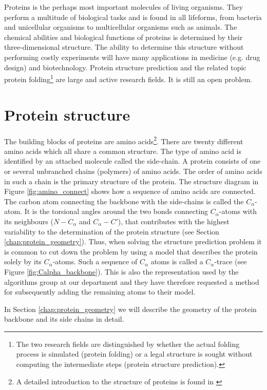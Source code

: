 Proteins is the perhaps most important molecules of living
organisms. They perform a multitude of biological tasks and is found
in all lifeforms, from bacteria and unicellular organisms to
multicellular organisms such as animals. The chemical abilities and
biological functions of proteins is determined by their
three-dimensional structure. The ability to determine this structure
without performing costly experiments will have many applications in
medicine (e.g. drug design) and biotechnology. Protein structure
prediction and the related topic protein folding\footnote{The two
  research fields are distinguished by whether the actual folding
  process is simulated (protein folding) or a legal structure is
  sought without computing the intermediate steps (protein structure
  prediction).} are large and active research fields. It is still an
open problem.

\section{Protein structure}
The building blocks of proteins are amino acids\footnote{A detailed
  introduction to the structure of proteins is found in
  \cite{branden}}. There are twenty different amino acids which all
share a common structure. The type of amino acid is identified by an
attached molecule called the side-chain. A protein consists of one or
several unbranched chains (polymers) of amino acids. The order of
amino acids in such a chain is the primary structure of the protein.
The structure diagram in Figure \ref{fig:amino_connect} shows how a
sequence of amino acids are connected. The carbon atom connecting the
backbone with the side-chains is called the $C_\alpha$-atom. It is the
torsional angles around the two bonds connecting $C_\alpha$-atoms with
its neighbours ($N-C_\alpha$ and $C_\alpha-C'$), that contributes with
the highest variability to the determination of the protein structure
(see Section \ref{chap:protein_geometry}). Thus, when solving the
structure prediction problem it is common  to cut down
the problem by using a model that describes the protein solely by its
$C_\alpha$-atoms. Such a sequence of $C_{\alpha}$ atoms is called a
$C_{\alpha}$-trace (see Figure \ref{fig:Calpha_backbone}). This is
also the representation used by the algorithms group at our department
and they have therefore requested a method for subsequently adding the
remaining atoms to their model.

In Section \ref{chap:protein_geometry} we will describe the geometry
of the protein backbone and its side chains in detail.

